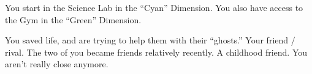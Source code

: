 \documentclass[char]{TMFHope}
\begin{document}
\begin{itemz}[Notes]
	\item You start in the Science Lab in the ``Cyan'' Dimension. You also have access to the Gym in the ``Green'' Dimension. 
\end{itemz}

\begin{contacts}
	\contact{\cCap{}} You saved \cCap{\their} life, and are trying to help them with their ``ghosts.''
	\contact{\cSci{}} Your friend / rival. The two of you became friends relatively recently.
	\contact{\cCDip{}} A childhood friend. You aren't really close anymore.
\end{contacts}
\end{document}
